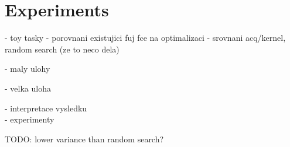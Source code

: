 \chapter{Experiments}
\label{chapter:experiments}

- toy tasky
  - porovnani existujici fuj fce na optimalizaci
  - srovnani acq/kernel, random search (ze to neco dela)

- maly ulohy

- velka uloha

- interpretace vysledku
\\



- experimenty

TODO: lower variance than random search?